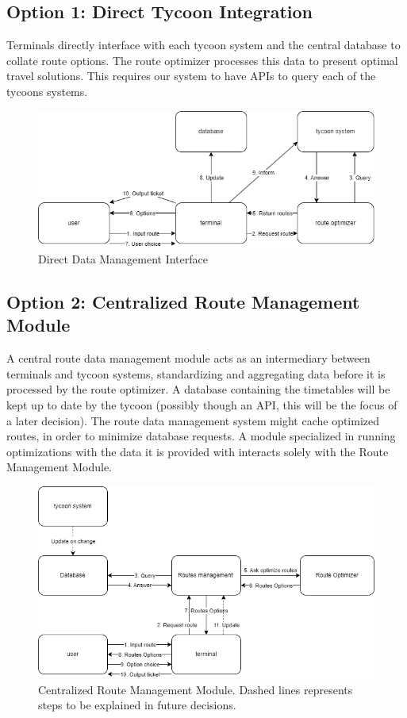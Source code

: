 \subsection*{Option 1: Direct Tycoon Integration}
Terminals directly interface with each tycoon system and the central database to collate route options. The route optimizer processes this data to present optimal travel solutions. This requires our system to have APIs to query each of the tycoons systems.
\begin{figure}[ht]
    \centering
    \includegraphics[width=\textwidth]{drawings/decision3_drawings/direct.png}
    \caption{Direct Data Management Interface}
    \label{fig:direct-data-interface}
\end{figure}

\subsection*{Option 2: Centralized Route Management Module}
A central route data management module acts as an intermediary between terminals and tycoon systems, standardizing and aggregating data before it is processed by the route optimizer. A database containing the timetables will be kept up to date by the tycoon (possibly though an API, this will be the focus of a later decision). The route data management system might cache optimized routes, in order to minimize database requests. A module specialized in running optimizations with the data it is provided with interacts solely with the Route Management Module.
\begin{figure}[ht]
    \centering
    \includegraphics[width=\textwidth]{drawings/decision3_drawings/centralized.png}
    \caption{Centralized Route Management Module. Dashed lines represents steps to be explained in future decisions.}
    \label{fig:centralized-data-interface}
\end{figure}
  
